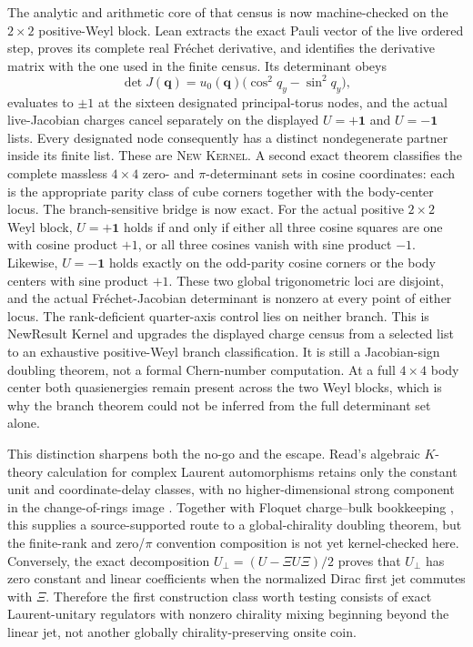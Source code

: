 \documentclass[11pt]{article}
\newcommand{\Kernel}{\textcolor{kernelcolor}{\textsc{Kernel}}}
\newcommand{\NewResult}{\textsc{New}}
\newcommand{\id}{\mathbf{1}}
\begin{document}
The analytic and arithmetic core of that census is now machine-checked on the
$2\times2$ positive-Weyl block.  Lean extracts the exact Pauli vector of the
live ordered step, proves its complete real Fr\'echet derivative, and identifies
the derivative matrix with the one used in the finite census.  Its determinant
obeys
\begin{equation}
 \det J(\mathbf q)=u_0(\mathbf q)
   \bigl(\cos^2 q_y-\sin^2 q_y\bigr),
\end{equation}
evaluates to $\pm1$ at the sixteen designated principal-torus nodes, and the
actual live-Jacobian charges cancel separately on the displayed $U=+\id$ and
$U=-\id$ lists.  Every designated node consequently has a distinct
nondegenerate partner inside its finite list.  These are \NewResult{}
\Kernel{}.  A second exact theorem classifies the complete massless
$4\times4$ zero- and $\pi$-determinant sets in cosine coordinates: each is the
appropriate parity class of cube corners together with the body-center locus.
The branch-sensitive bridge is now exact.  For the actual positive
$2\times2$ Weyl block, $U=+\id$ holds if and only if either all three cosine
squares are one with cosine product $+1$, or all three cosines vanish with
sine product $-1$.  Likewise, $U=-\id$ holds exactly on the odd-parity cosine
corners or the body centers with sine product $+1$.  These two global
trigonometric loci are disjoint, and the actual Fr\'echet-Jacobian determinant
is nonzero at every point of either locus.  The rank-deficient quarter-axis
control lies on neither branch.  This is NewResult{} Kernel{} and upgrades
the displayed charge census from a selected list to an exhaustive positive-Weyl
branch classification.  It is still a Jacobian-sign doubling theorem, not a
formal Chern-number computation.  At a full $4\times4$ body center both
quasienergies remain present across the two Weyl blocks, which is why the
branch theorem could not be inferred from the full determinant set alone.

This distinction sharpens both the no-go and the escape.  Read's algebraic
$K$-theory calculation for complex Laurent automorphisms retains only the
constant unit and coordinate-delay classes, with no higher-dimensional strong
component in the change-of-rings image \cite{ReadLaurentKTheory}.  Together
with Floquet charge--bulk bookkeeping \cite{BesshoSatoFloquet}, this supplies a
source-supported route to a global-chirality doubling theorem, but the
finite-rank and zero/$\pi$ convention composition is not yet kernel-checked
here.  Conversely, the exact decomposition
$U_\perp=(U-\Xi U\Xi)/2$ proves that $U_\perp$ has zero constant and linear
coefficients when the normalized Dirac first jet commutes with $\Xi$.
Therefore the first construction class worth testing consists of exact
Laurent-unitary regulators with nonzero chirality mixing beginning beyond the
linear jet, not another globally chirality-preserving onsite coin.
\end{document}
